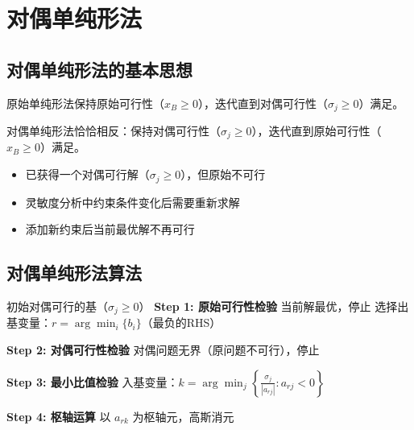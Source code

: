 \section{对偶单纯形法}\label{sec:dual-simplex}

\subsection{对偶单纯形法的基本思想}

原始单纯形法保持原始可行性（$x_B \geq 0$），迭代直到对偶可行性（$\sigma_j \geq 0$）满足。

对偶单纯形法恰恰相反：保持对偶可行性（$\sigma_j \geq 0$），迭代直到原始可行性（$x_B \geq 0$）满足。

\begin{conceptbox}[对偶单纯形法的适用场景]
\begin{itemize}
    \item 已获得一个对偶可行解（$\sigma_j \geq 0$），但原始不可行
    \item 灵敏度分析中约束条件变化后需要重新求解
    \item 添加新约束后当前最优解不再可行
\end{itemize}
\end{conceptbox}

\subsection{对偶单纯形法算法}

\begin{algorithm}[H]
\caption{对偶单纯形法}
\begin{algorithmic}[1]
\Require 初始对偶可行的基（$\sigma_j \geq 0$）
    \State \textbf{Step 1: 原始可行性检验}
        \State 当前解最优，停止
    \EndIf
    \State 选择出基变量：$r = \arg\min_i \{b_i\}$（最负的RHS）
    
    \State \textbf{Step 2: 对偶可行性检验}
        \State 对偶问题无界（原问题不可行），停止
    \EndIf
    
    \State \textbf{Step 3: 最小比值检验}
    \State 入基变量：$k = \arg\min_j \left\{\frac{\sigma_j}{|a_{rj}|} : a_{rj} < 0\right\}$
    
    \State \textbf{Step 4: 枢轴运算}
    \State 以 $a_{rk}$ 为枢轴元，高斯消元
\EndWhile
\end{algorithmic}
\end{algorithm}

